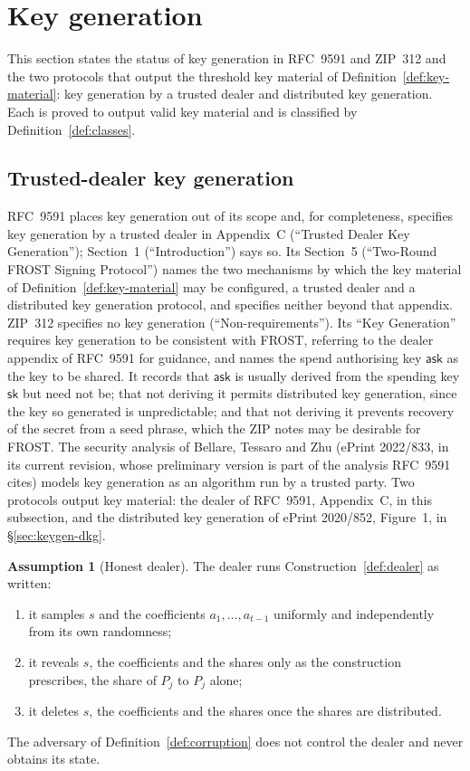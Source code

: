 \documentclass[11pt,a4paper]{article}
\theoremstyle{definition}
\newtheorem{assumption}[theorem]{Assumption}
\newcommand{\ask}{\ensuremath{\mathsf{ask}}}
\begin{document}
\section{Key generation}\label{sec:keygen}

This section states the status of key generation in RFC~9591 and ZIP~312
and the two protocols that output the threshold key material of
Definition~\ref{def:key-material}: key generation by a trusted dealer and
distributed key generation. Each is proved to output valid key material and
is classified by Definition~\ref{def:classes}.

\subsection{Trusted-dealer key generation}\label{sec:keygen-dealer}

RFC~9591 places key generation out of its scope and, for completeness,
specifies key generation by a trusted dealer in Appendix~C (``Trusted Dealer
Key Generation''); Section~1 (``Introduction'') says so. Its Section~5
(``Two-Round FROST Signing Protocol'') names the two mechanisms by which the
key material of Definition~\ref{def:key-material} may be configured, a
trusted dealer and a distributed key generation protocol, and specifies
neither beyond that appendix. ZIP~312 specifies no key generation
(``Non-requirements''). Its ``Key Generation'' requires key generation to be
consistent with FROST, referring to the dealer appendix of RFC~9591 for
guidance, and names the spend authorising key \(\ask\) as the key to be
shared. It records that \(\ask\) is usually derived from the spending key
\(\mathsf{sk}\) but need not be; that not deriving it permits distributed key
generation, since the key so generated is unpredictable; and that not
deriving it prevents recovery of the secret from a seed phrase, which the ZIP
notes may be desirable for FROST. The security analysis of Bellare, Tessaro
and Zhu (ePrint 2022/833, in its current revision, whose preliminary version
is part of the analysis RFC~9591 cites) models key generation as an
algorithm run by a trusted party. Two protocols output key material: the
dealer of RFC~9591, Appendix~C, in this subsection, and the distributed key
generation of ePrint 2020/852, Figure~1, in \S\ref{sec:keygen-dkg}.

\begin{assumption}[Honest dealer]\label{ass:dealer}
The dealer runs Construction~\ref{def:dealer} as written:
\begin{enumerate}
\item it samples \(s\) and the coefficients \(a_1, \dots, a_{t-1}\)
  uniformly and independently from its own randomness;
\item it reveals \(s\), the coefficients and the shares only as the
  construction prescribes, the share of \(P_j\) to \(P_j\) alone;
\item it deletes \(s\), the coefficients and the shares once the shares are
  distributed.
\end{enumerate}
The adversary of Definition~\ref{def:corruption} does not control the
dealer and never obtains its state.
\end{assumption}
\end{document}
